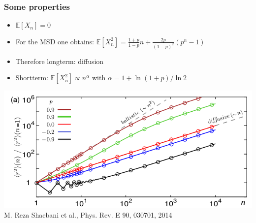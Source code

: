 \documentclass[11pt]{beamer}
\begin{document}
\begin{frame}
 \frametitle{Some properties}
 

  \begin{itemize}
  \item $\mathbb{E}\left[X_n\right] = 0$
  \item For the MSD one obtains:
  $\mathbb{E}\left[X_n^2\right] = \frac{1+p}{1-p}n+\frac{2p}{\left(1-p\right)^2}\left(p^n-1\right)$
  \item Therefore longterm: diffusion
  \item Shortterm: $\mathbb{E}\left[X_n^2\right] \propto n^\alpha$ with
  $\alpha = 1 + \ln\left(1+p\right) / \ln 2$
  \end{itemize}
  \centering
  \includegraphics[width=0.7\linewidth]{gfx/msd.png}
 {\newline\tiny M. Reza Shaebani et al., Phys. Rev. E 90, 030701, 2014}
\end{frame}
\end{document}
